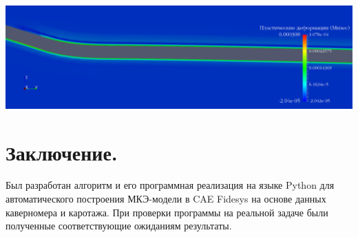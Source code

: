 \documentclass[a4paper,14pt]{scrartcl}
\begin{document}
\vspace{30px}
\includegraphics[width=1\textwidth]{images/plasticity.png}

\newpage
\section{Заключение.}
Был разработан алгоритм и его программная реализация на языке Python для автоматического построения МКЭ-модели в CAE Fidesys на основе данных каверномера и каротажа. При проверки программы на реальной задаче были полученные соответствующие ожиданиям результаты.
\end{document}
